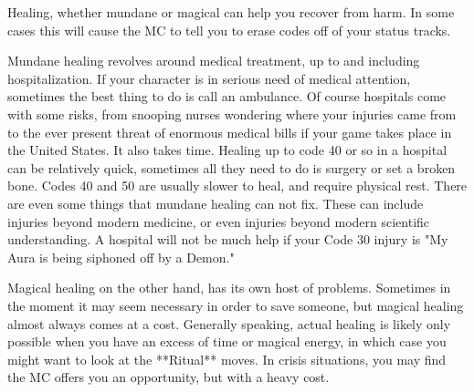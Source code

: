 \documentclass[
  oneside,
  statementpaper,
  9pt]{memoir}
\begin{document}
\begin{Player}

Healing, whether mundane or magical can help you recover from harm. In some cases this will cause the MC to tell you to erase codes off of your status tracks. 

Mundane healing revolves around medical treatment, up to and including hospitalization. If your character is in serious need of medical attention, sometimes the best thing to do is call an ambulance. Of course hospitals come with some risks, from snooping nurses wondering where your injuries came from to the ever present threat of enormous medical bills if your game takes place in the United States. It also takes time. Healing up to code 40 or so in a hospital can be relatively quick, sometimes all they need to do is surgery or set a broken bone. Codes 40 and 50 are usually slower to heal, and require physical rest. There are even some things that mundane healing can not fix. These can include injuries beyond modern medicine, or even injuries beyond modern scientific understanding. A hospital will not be much help if your Code 30 injury is "My Aura is being siphoned off by a Demon."

Magical healing on the other hand, has its own host of problems. Sometimes in the moment it may seem necessary in order to save someone, but magical healing almost always comes at a cost. Generally speaking, actual healing is likely only possible when you have an excess of time or magical energy, in which case you might want to look at the **Ritual** moves. In crisis situations, you may find the MC offers you an opportunity, but with a heavy cost.

\end{Player}
\end{document}
